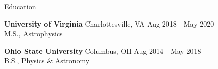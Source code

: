 \documentclass{resume} %
\begin{document}

\begin{rSection}{Education}

\textbf{University of Virginia} Charlottesville, VA
\hfill Aug 2018 - May 2020\\
M.S., Astrophysics

\textbf{Ohio State University} Columbus, OH
\hfill Aug 2014 - May 2018\\
B.S., Physics \& Astronomy%

\end{rSection}

\end{document}
